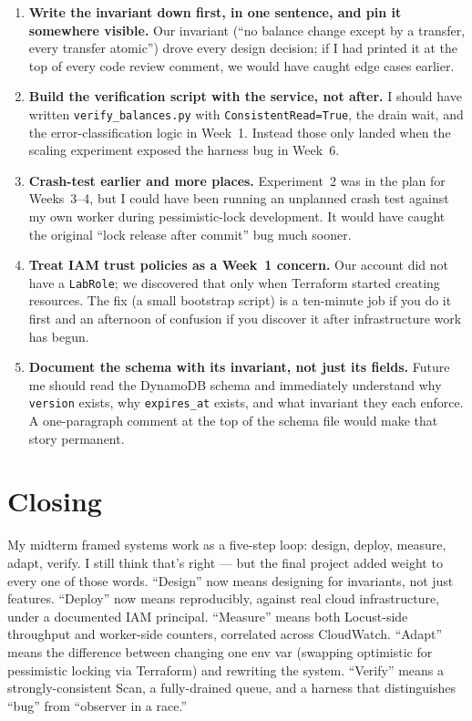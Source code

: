 \documentclass[11pt,a4paper]{article}
\begin{document}
\begin{lessonbox}
\begin{enumerate}[leftmargin=*, itemsep=0.15em]
    \item \textbf{Write the invariant down first, in one sentence, and pin it somewhere visible.} Our invariant (``no balance change except by a transfer, every transfer atomic'') drove every design decision; if I had printed it at the top of every code review comment, we would have caught edge cases earlier.
    \item \textbf{Build the verification script with the service, not after.} I should have written \texttt{verify\_balances.py} with \texttt{ConsistentRead=True}, the drain wait, and the error-classification logic in Week~1. Instead those only landed when the scaling experiment exposed the harness bug in Week~6.
    \item \textbf{Crash-test earlier and more places.} Experiment~2 was in the plan for Weeks~3--4, but I could have been running an unplanned crash test against my own worker during pessimistic-lock development. It would have caught the original ``lock release after commit'' bug much sooner.
    \item \textbf{Treat IAM trust policies as a Week~1 concern.} Our account did not have a \texttt{LabRole}; we discovered that only when Terraform started creating resources. The fix (a small bootstrap script) is a ten-minute job if you do it first and an afternoon of confusion if you discover it after infrastructure work has begun.
    \item \textbf{Document the schema with its invariant, not just its fields.} Future me should read the DynamoDB schema and immediately understand why \texttt{version} exists, why \texttt{expires\_at} exists, and what invariant they each enforce. A one-paragraph comment at the top of the schema file would make that story permanent.
\end{enumerate}
\end{lessonbox}

\section*{Closing}

My midterm framed systems work as a five-step loop: design, deploy, measure, adapt, verify. I still think that's right --- but the final project added weight to every one of those words. ``Design'' now means designing for invariants, not just features. ``Deploy'' now means reproducibly, against real cloud infrastructure, under a documented IAM principal. ``Measure'' means both Locust-side throughput and worker-side counters, correlated across CloudWatch. ``Adapt'' means the difference between changing one env var (swapping optimistic for pessimistic locking via Terraform) and rewriting the system. ``Verify'' means a strongly-consistent Scan, a fully-drained queue, and a harness that distinguishes ``bug'' from ``observer in a race.''
\end{document}
